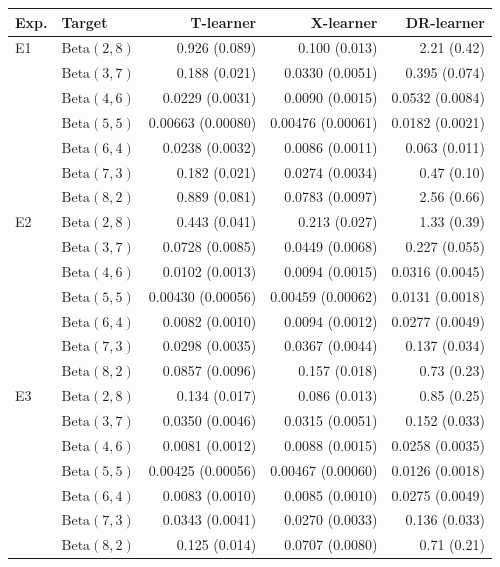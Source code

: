 \begin{tabular}{llrrr}
\hline
Exp. & Target & T-learner & X-learner & DR-learner \\
\hline
E1 & $\mathrm{Beta}(2,8)$ & 0.926 (0.089) & 0.100 (0.013) & 2.21 (0.42) \\
 & $\mathrm{Beta}(3,7)$ & 0.188 (0.021) & 0.0330 (0.0051) & 0.395 (0.074) \\
 & $\mathrm{Beta}(4,6)$ & 0.0229 (0.0031) & 0.0090 (0.0015) & 0.0532 (0.0084) \\
 & $\mathrm{Beta}(5,5)$ & 0.00663 (0.00080) & 0.00476 (0.00061) & 0.0182 (0.0021) \\
 & $\mathrm{Beta}(6,4)$ & 0.0238 (0.0032) & 0.0086 (0.0011) & 0.063 (0.011) \\
 & $\mathrm{Beta}(7,3)$ & 0.182 (0.021) & 0.0274 (0.0034) & 0.47 (0.10) \\
 & $\mathrm{Beta}(8,2)$ & 0.889 (0.081) & 0.0783 (0.0097) & 2.56 (0.66) \\[3pt]
E2 & $\mathrm{Beta}(2,8)$ & 0.443 (0.041) & 0.213 (0.027) & 1.33 (0.39) \\
 & $\mathrm{Beta}(3,7)$ & 0.0728 (0.0085) & 0.0449 (0.0068) & 0.227 (0.055) \\
 & $\mathrm{Beta}(4,6)$ & 0.0102 (0.0013) & 0.0094 (0.0015) & 0.0316 (0.0045) \\
 & $\mathrm{Beta}(5,5)$ & 0.00430 (0.00056) & 0.00459 (0.00062) & 0.0131 (0.0018) \\
 & $\mathrm{Beta}(6,4)$ & 0.0082 (0.0010) & 0.0094 (0.0012) & 0.0277 (0.0049) \\
 & $\mathrm{Beta}(7,3)$ & 0.0298 (0.0035) & 0.0367 (0.0044) & 0.137 (0.034) \\
 & $\mathrm{Beta}(8,2)$ & 0.0857 (0.0096) & 0.157 (0.018) & 0.73 (0.23) \\[3pt]
E3 & $\mathrm{Beta}(2,8)$ & 0.134 (0.017) & 0.086 (0.013) & 0.85 (0.25) \\
 & $\mathrm{Beta}(3,7)$ & 0.0350 (0.0046) & 0.0315 (0.0051) & 0.152 (0.033) \\
 & $\mathrm{Beta}(4,6)$ & 0.0081 (0.0012) & 0.0088 (0.0015) & 0.0258 (0.0035) \\
 & $\mathrm{Beta}(5,5)$ & 0.00425 (0.00056) & 0.00467 (0.00060) & 0.0126 (0.0018) \\
 & $\mathrm{Beta}(6,4)$ & 0.0083 (0.0010) & 0.0085 (0.0010) & 0.0275 (0.0049) \\
 & $\mathrm{Beta}(7,3)$ & 0.0343 (0.0041) & 0.0270 (0.0033) & 0.136 (0.033) \\
 & $\mathrm{Beta}(8,2)$ & 0.125 (0.014) & 0.0707 (0.0080) & 0.71 (0.21) \\[3pt]

\end{tabular}
